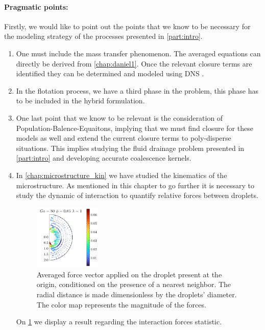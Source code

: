 \paragraph*{Pragmatic points: }
Firstly,  we would like to point out the points that we know to be necessary for the modeling strategy of the processes presented in \ref{part:intro}.
\begin{enumerate}
    \item One must include the mass transfer phenomenon.
    The averaged equations can directly be derived from \ref{chap:daniel1}.
    Once the relevant closure terms are identified  they can be determined and modeled using DNS \citep{hidman2023assessing}. 
    \item In the flotation process, we have a third phase in the problem, this phase has to be included in the hybrid formulation. 
    \item One last point that we know to be relevant is the consideration of Population-Balence-Equaitons, implying that we must find closure for these models as well and extend the current closure terms to poly-disperse situations. 
    This implies studying the fluid drainage problem presented in \ref{part:intro} and developing accurate coalescence kernels. 
    \item In \ref{chap:microstructure_kin} we have studied the kinematics of the microstructure. 
    As mentioned in this chapter to go further it is necessary to study the dynamic of interaction to quantify relative forces between droplets. 
    \begin{figure}[h!]
        \centering
        \includegraphics[width=0.3\textwidth]{image/HOMOGENEOUS_final/Dist/F_rel_l_1_Ga_80_PHI_5}
        \caption{Averaged force vector applied on the droplet present at the origin, conditioned on the presence of a nearest neighbor.
        The radial distance is made dimensionless by the droplets' diameter. 
        The color map represents the magnitude of the forces.}
        \label{fig:perspective_forces}
    \end{figure}
    On \ref{fig:perspective_forces} we display a result regarding the interaction forces statistic. 

\end{enumerate}
